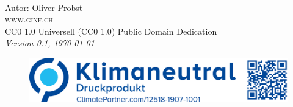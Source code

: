 \newpage
~\vfill
\thispagestyle{empty}

\noindent Autor: Oliver Probst\\

\noindent \textsc{www.ginf.ch}\\

\noindent \ccLogo \hspace{0.1cm} \ccZero \hspace{0.1cm} CC0 1.0 Universell (CC0 1.0) Public Domain Dedication \\

\noindent \textit{Version 0.1, \today}

\begin{figure}[htb]
\includegraphics[scale=0.15]{climate}
\end{figure}
